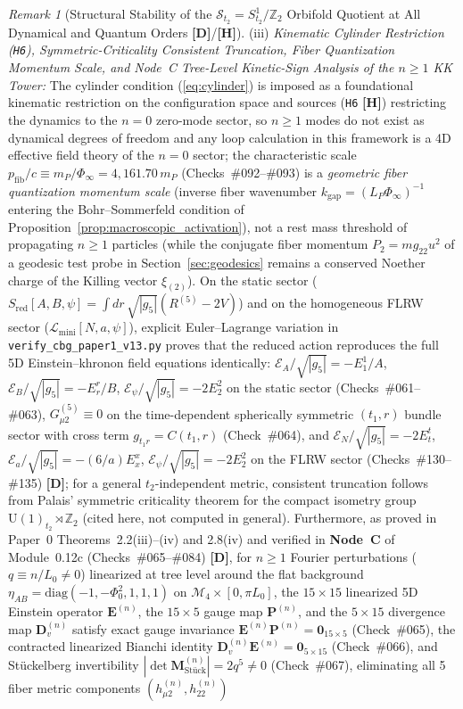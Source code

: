 \documentclass[11pt,a4paper]{article}
\newcommand{\catD}{\textbf{\textcolor{blue!75!black}{[D]}}}
\newcommand{\catH}{\textbf{\textcolor{orange!85!black}{[H]}}}
\theoremstyle{definition}
\theoremstyle{remark}
\newtheorem{remark}[theorem]{Remark}
\begin{document}
\begin{remark}[Structural Stability of the $\mathcal{S}_{t_2} = S^1_{t_2}/\mathbb{Z}_2$ Orbifold Quotient at All Dynamical and Quantum Orders \catD/\catH]
(iii) \emph{Kinematic Cylinder Restriction (\texttt{H6}), Symmetric-Criticality Consistent Truncation, Fiber Quantization Momentum Scale, and Node~C Tree-Level Kinetic-Sign Analysis of the $n \ge 1$ KK Tower:} The cylinder condition (\ref{eq:cylinder}) is imposed as a foundational kinematic restriction on the configuration space and sources (\texttt{H6} \catH) restricting the dynamics to the $n = 0$ zero-mode sector, so $n \ge 1$ modes do not exist as dynamical degrees of freedom and any loop calculation in this framework is a 4D effective field theory of the $n = 0$ sector; the characteristic scale $p_{\text{fib}}/c \equiv m_P/\Phi_\infty = 4{,}161.70\,m_P$ (Checks~\#092--\#093) is a \emph{geometric fiber quantization momentum scale} (inverse fiber wavenumber $k_{\text{gap}} = (L_P\Phi_\infty)^{-1}$ entering the Bohr--Sommerfeld condition of Proposition~\ref{prop:macroscopic_activation}), not a rest mass threshold of propagating $n \ge 1$ particles (while the conjugate fiber momentum $P_2 = m g_{22} u^2$ of a geodesic test probe in Section~\ref{sec:geodesics} remains a conserved Noether charge of the Killing vector $\xi_{(2)}$). On the static sector ($S_{\text{red}}[A,B,\psi] = \int dr\,\sqrt{|g_5|}(R^{(5)} - 2V)$) and on the homogeneous FLRW sector ($\mathcal{L}_{\text{mini}}[N,a,\psi]$), explicit Euler--Lagrange variation in \texttt{verify\_cbg\_paper1\_v13.py} proves that the reduced action reproduces the full 5D Einstein--khronon field equations identically: $\mathcal{E}_A/\sqrt{|g_5|} = -E^1_1/A$, $\mathcal{E}_B/\sqrt{|g_5|} = -E^r_r/B$, $\mathcal{E}_\psi/\sqrt{|g_5|} = -2E^2_2$ on the static sector (Checks~\#061--\#063), $G_{\mu 2}^{(5)} \equiv 0$ on the time-dependent spherically symmetric $(t_1, r)$ bundle sector with cross term $g_{t_1 r} = C(t_1, r)$ (Check~\#064), and $\mathcal{E}_N/\sqrt{|g_5|} = -2E^t_t$, $\mathcal{E}_a/\sqrt{|g_5|} = -(6/a)E^x_x$, $\mathcal{E}_\psi/\sqrt{|g_5|} = -2E^2_2$ on the FLRW sector (Checks~\#130--\#135) \catD; for a general $t_2$-independent metric, consistent truncation follows from Palais' symmetric criticality theorem \cite{Palais1979} for the compact isometry group $\mathrm{U}(1)_{t_2} \rtimes \mathbb{Z}_2$ (cited here, not computed in general). Furthermore, as proved in Paper~0 Theorems~2.2(iii)--(iv) and 2.8(iv) \cite{JV_Paper0} and verified in \textbf{Node~C} of Module~0.12c (Checks~\#065--\#084) \catD, for $n \ge 1$ Fourier perturbations ($q \equiv n/L_0 \neq 0$) linearized at tree level around the flat background $\eta_{AB} = \text{diag}(-1, -\Phi_0^2, 1, 1, 1)$ on $\mathcal{M}_4 \times [0, \pi L_0]$, the $15\times 15$ linearized 5D Einstein operator $\mathbf{E}^{(n)}$, the $15\times 5$ gauge map $\mathbf{P}^{(n)}$, and the $5\times 15$ divergence map $\mathbf{D}_v^{(n)}$ satisfy exact gauge invariance $\mathbf{E}^{(n)}\mathbf{P}^{(n)} = \mathbf{0}_{15\times 5}$ (Check~\#065), the contracted linearized Bianchi identity $\mathbf{D}_v^{(n)}\mathbf{E}^{(n)} = \mathbf{0}_{5\times 15}$ (Check~\#066), and St\"uckelberg invertibility $|\det\mathbf{M}_{\text{St\"uck}}^{(n)}| = 2 q^5 \neq 0$ (Check~\#067), eliminating all 5 fiber metric components $(h_{\mu 2}^{(n)}, h_{22}^{(n)})$ 
\end{remark}
\end{document}
